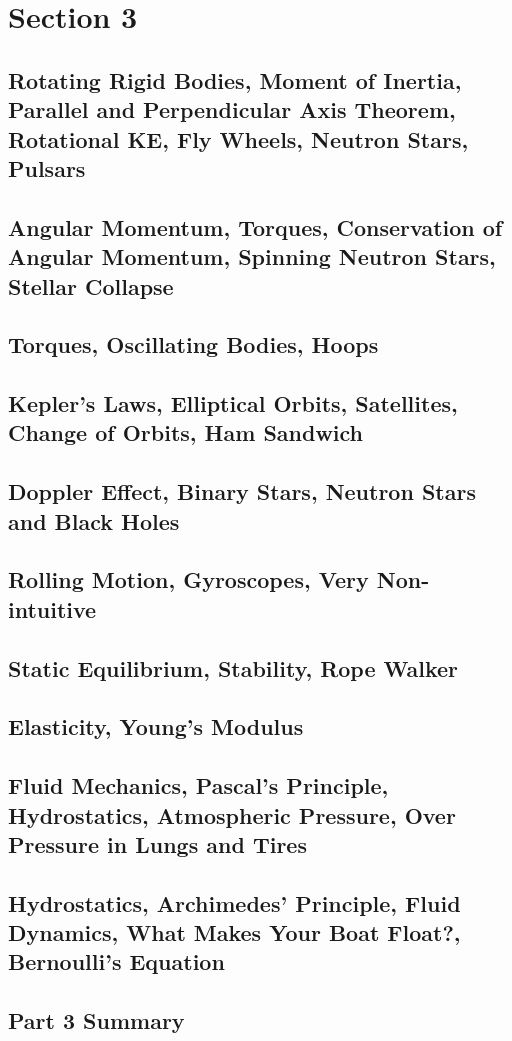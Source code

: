 \documentclass[../introphysics.tex]{subfiles}
\begin{document}
\chapter{Section 3}
\section{Rotating Rigid Bodies, Moment of Inertia, Parallel and Perpendicular Axis Theorem, Rotational KE, Fly Wheels, Neutron Stars, Pulsars}
\section{Angular Momentum, Torques, Conservation of Angular Momentum, Spinning Neutron Stars, Stellar Collapse}
\section{Torques, Oscillating Bodies, Hoops}
\section{Kepler's Laws, Elliptical Orbits, Satellites, Change of Orbits, Ham Sandwich}
\section{Doppler Effect, Binary Stars, Neutron Stars and Black Holes}
\section{Rolling Motion, Gyroscopes, Very Non-intuitive}
\section{Static Equilibrium, Stability, Rope Walker}
\section{Elasticity, Young's Modulus}
\section{Fluid Mechanics, Pascal's Principle, Hydrostatics, Atmospheric Pressure, Over Pressure in Lungs and Tires}
\section{Hydrostatics, Archimedes' Principle, Fluid Dynamics, What Makes Your Boat Float?, Bernoulli's Equation}
\section{Part 3 Summary}
\end{document}
